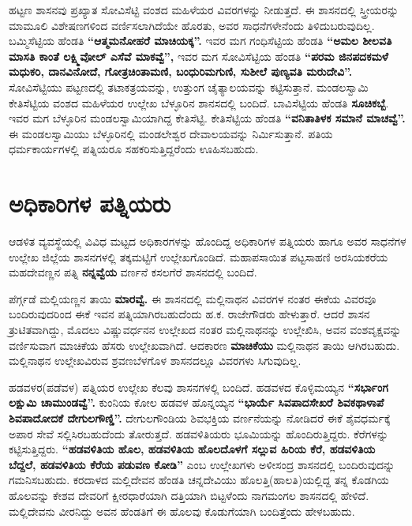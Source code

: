 ಹಟ್ಟಣ ಶಾಸನವು ಪ್ರಖ್ಯಾತ ಸೋವಿಸೆಟ್ಟಿ ವಂಶದ ಮಹಿಳೆಯರ ವಿವರಗಳನ್ನು ನೀಡುತ್ತದೆ. ಈ ಶಾಸನ\-ದಲ್ಲಿ ಸ್ತ್ರೀಯರನ್ನು ಮಾಮೂಲಿ ವಿಶೇಷಣಗಳಿಂದ ವರ್ಣಿಸಲಾಗಿದೆಯೇ ಹೊರತು, ಅವರ ಸಾಧನೆಗಳೇನೆಂದು ತಿಳಿದುಬರುವುದಿಲ್ಲ. ಬಮ್ಮಿಸೆಟ್ಟಿಯ ಹೆಂಡತಿ \textbf{“ಆತ್ಮಮನೋಹರೆ ಮಾಚಿಯಕ್ಕ”.} ಇವರ ಮಗ ಗಂಧಿಸೆಟ್ಟಿಯ ಹೆಂಡತಿ \textbf{“ಅಮಲ ಶೀಲವತಿ ಮಾಸತಿ ಕಾಂತೆ ಲಕ್ಷ್ಮಿವೋಲ್​ ಎಸೆವೆ ಮಾಕವ್ವೆ”,} ಇವರ ಮಗ ಸೋವಿಸೆಟ್ಟಿಯ ಹೆಂಡತಿ \textbf{“ಪರಮ ಜಿನಪದಕಮಳೆ ಮಧುಕರಿ, ದಾನವಿನೋದೆ, ಗೋತ್ರಚಿಂತಾಮಣಿ, ಬಂಧುರಿಮಗುಣಿ, ಸುಶೀಲೆ ಪುಣ್ಯವತಿ ಮರುದೇವಿ”.} ಸೋವಿಸೆಟ್ಟಿಯು ಪಟ್ಟಣದಲ್ಲಿ ತಟಾಕತ್ರಯವನ್ನು, ಉತ್ತುಂಗ ಚೈತ್ಯಾಲಯವನ್ನು ಕಟ್ಟಿಸುತ್ತಾನೆ. ಮಂಡಲಸ್ವಾಮಿ ಕೇತಿಸೆಟ್ಟಿಯ ವಂಶದ ಮಹಿಳೆಯರ ಉಲ್ಲೇಖ ಬೆಳ್ಳೂರಿನ ಶಾನಸದಲ್ಲಿ ಬಂದಿದೆ. ಬಾವಿಸೆಟ್ಟಿಯ ಹೆಂಡತಿ \textbf{ಸೂಚಿಕಬ್ಬೆ}. ಇವರ ಮಗ ಬೆಳ್ಳೂರಿನ ಮಂಡಲಸ್ವಾಮಿಯಾಗಿದ್ದ ಕೇತಿಸೆಟ್ಟಿ. ಕೇತಿಸೆಟ್ಟಿಯ ಹೆಂಡತಿ \textbf{“ವನಿತಾತಿಳಕ ಸಮಾನೆ ಮಾಚವ್ವೆ”.} ಈ ಮಂಡಲಸ್ವಾಮಿಯು ಬೆಳ್ಳೂರಿನಲ್ಲಿ ಮಂಡಲೇಶ್ವರ ದೇವಾಲಯವನ್ನು ನಿರ್ಮಿಸುತ್ತಾನೆ. ಪತಿಯ ಧರ್ಮಕಾರ್ಯಗಳಲ್ಲಿ ಪತ್ನಿಯರೂ ಸಹಕರಿಸುತ್ತಿದ್ದರೆಂದು ಊಹಿಸಬಹುದು.


\section{ಅಧಿಕಾರಿಗಳ ಪತ್ನಿಯರು}

ಆಡಳಿತ ವ್ಯವಸ್ಥೆಯಲ್ಲಿ ವಿವಿಧ ಮಟ್ಟದ ಅಧಿಕಾರಗಳನ್ನು ಹೊಂದಿದ್ದ ಅಧಿಕಾರಿಗಳ ಪತ್ನಿಯರು ಹಾಗೂ ಅವರ ಸಾಧನೆಗಳ ಉಲ್ಲೇಖ ಜಿಲ್ಲೆಯ ಶಾಸನಗಳಲ್ಲಿ ತಕ್ಕಮಟ್ಟಿಗೆ ಉಲ್ಲೇಖಗೊಂಡಿದೆ. ಮಹಾಪಸಾಯಿತ ಪಟ್ಟಸಾಹಣಿ ಅರಸಿಯಕರೆಯ ಮಹದೇವಣ್ಣನ ಪತ್ನಿ \textbf{ನನ್ನವ್ವೆಯ} ವರ್ಣನೆ ಕಸಲಗೆರೆ ಶಾಸನದಲ್ಲಿ ಬಂದಿದೆ.

ಪೆರ್ಗ್ಗಡೆ ಮಲ್ಲಿಯಣ್ಣನ ತಾಯಿ \textbf{ಮಾರವ್ವೆ.} ಈ ಶಾಸನದಲ್ಲಿ ಮಲ್ಲಿನಾಥನ ವಿವರಗಳ ನಂತರ ಈಕೆಯ ವಿವರವೂ ಬಂದಿರುವುದರಿಂದ ಈಕೆ ಇವನ ಪತ್ನಿಯಾಗಿರಬಹುದೆಂದು ಹ.ಕ. ರಾಜೇಗೌಡರು ಹೇಳುತ್ತಾರೆ. ಆದರೆ ಶಾಸನ ತ್ರುಟಿತವಾಗಿದ್ದು, ಮೊದಲು ವಿಷ್ಣುವರ್ಧನನ ಉಲ್ಲೇಖದ ನಂತರ ಮಲ್ಲಿನಾಥನನ್ನು ಉಲ್ಲೇಖಿಸಿ, ಅವನ ವಂಶವೃಕ್ಷವನ್ನು ವರ್ಣಿಸುವಾಗ ಮಾಚಿಕೆಯ ಹೆಸರು ಉಲ್ಲೇಖವಾಗಿದೆ. ಆದಕಾರಣ \textbf{ಮಾಚಿಕೆಯು} ಮಲ್ಲಿನಾಥನ ತಾಯಿ ಆಗಿರಬಹುದು. ಮಲ್ಲಿನಾಥನ ಉಲ್ಲೇಖವಿರುವ ಶ್ರವಣಬೆಳಗೊಳ ಶಾಸನದಲ್ಲೂ ವಿವರಗಳು ಸಿಗುವುದಿಲ್ಲ.

ಹಡವಳರ(ಪಡೆವಳ) ಪತ್ನಿಯರ ಉಲ್ಲೇಖ ಕೆಲವು ಶಾಸನಗಳಲ್ಲಿ ಬಂದಿದೆ. ಹಡವಳದ ಕೊಳ್ಳಿಮಯ್ಯನ \textbf{“ಸರ್ಭಾಂಗ ಲಕ್ಷುಮಿ ಚಾಮುಂಡವ್ವೆ”.} ಕುಂನಿಯ ಕೋಲ ಹಡವಳ ಹೊನ್ನಯ್ಯನ \textbf{“ಭಾರ್ಯೆ ಸಿವಪಾದಸೇಖರೆ ಶಿವಕಥಾಳಾಪೆ ಶಿವಪಾದೋದಕೆ ದೇಗುಲಗೌಣ್ಡಿ”.} ದೇಗುಲಗೌಂಡಿಯ ಶಿವಭಕ್ತಿಯ ವರ್ಣನೆಯನ್ನು ನೋಡಿದರೆ ಈಕೆ ಶೈವಧರ್ಮಕ್ಕೆ ಅಪಾರ ಸೇವೆ ಸಲ್ಲಿಸಿರಬಹುದೆಂದು ತೋರುತ್ತದೆ. ಹಡವಳಿತಿಯರು ಭೂಮಿಯನ್ನು ಹೊಂದಿರುತ್ತಿದ್ದರು. ಕೆರೆಗಳನ್ನು ಕಟ್ಟಿಸುತ್ತಿದ್ದರು. \textbf{“ಹಡವಳಿತಿಯ ಹೊಲ, ಹಡವಳಿತಿಯ ಹೊಲದೊಳಗೆ ಸಲ್ಲುವ ಹಿರಿಯ ಕೆರೆ, ಹಡವಳಿತಿಯ ಬೆದ್ದಲೆ, ಹಡವಳಿತಿಯ ಕೆರೆಯ ಪಡುವಣ ಕೋಡಿ”} ಎಂಬ ಉಲ್ಲೇಖಗಳು ಅಳೀಸಂದ್ರ ಶಾಸನದಲ್ಲಿ ಬಂದಿರುವುದನ್ನು ಗಮನಿಸಬಹುದು. ಕರದಾಳದ ಮಲ್ಲಿದೇವನ ಹೆಂಡತಿ ಚನ್ನದೇವಿಯು ಹೊಲತ್ತಿ(ಹಾಲತಿ)ಯಲ್ಲಿದ್ದ ತನ್ನ ಕೊಡಗಿಯ ಹೊಲವನ್ನು ಕೇಶವ ದೇವರಿಗೆ ಕ್ಷೀರಧಾರೆಯಾಗಿ ದತ್ತಿಯಾಗಿ ಬಿಟ್ಟಳೆಂದು ನಾಗಮಂಗಲ ಶಾಸನದಲ್ಲಿ ಹೇಳಿದೆ. ಮಲ್ಲಿದೇವನು ವೀರನಿದ್ದು ಅವನ ಹೆಂಡತಿಗೆ ಈ ಹೊಲವು ಕೊಡುಗೆಯಾಗಿ ಬಂದಿತ್ತೆಂದು ಹೇಳಬಹುದು.


